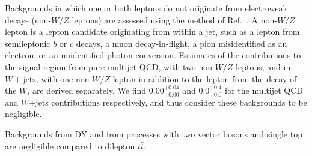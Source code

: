 
Backgrounds in which one or both leptons do not originate from electroweak decays (non-$W/Z$ leptons) 
are assessed using the method of Ref.~\cite{ref:top}.
A non-$W/Z$ lepton is a lepton candidate originating from within a jet,
such as a lepton from semileptonic $b$ or $c$ decays, a muon decay-in-flight, a pion misidentified 
as an electron, or an unidentified photon conversion.
Estimates of the contributions to the signal region from pure
multijet QCD, with two non-$W/Z$ leptons, and in $W+\mathrm{jets}$,
with one non-$W/Z$ lepton in addition to the lepton from the decay of the $W$, are
derived separately. We find $0.00^{+0.04}_{-0.00}$ and $0.0^{+0.4}_{-0.0}$ for the multijet
QCD and $W$+jets contributions respectively,
and thus consider these backgrounds to be negligible.

Backgrounds from DY and from processes with two vector bosons and single top 
are negligible compared to dilepton $t\bar{t}$. 

